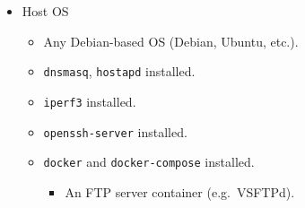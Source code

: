 \begin{itemize}
\tightlist
\item
  Host OS

  \begin{itemize}
  \tightlist
  \item
    Any Debian-based OS (Debian, Ubuntu, etc.).
  \item
    \texttt{dnsmasq}, \texttt{hostapd} installed.
  \item
    \texttt{iperf3} installed.
  \item
    \texttt{openssh-server} installed.
  \item
    \texttt{docker} and \texttt{docker-compose} installed.

    \begin{itemize}
    \tightlist
    \item
      An FTP server container (e.g.~VSFTPd).
    \end{itemize}
  \end{itemize}
\end{itemize}
